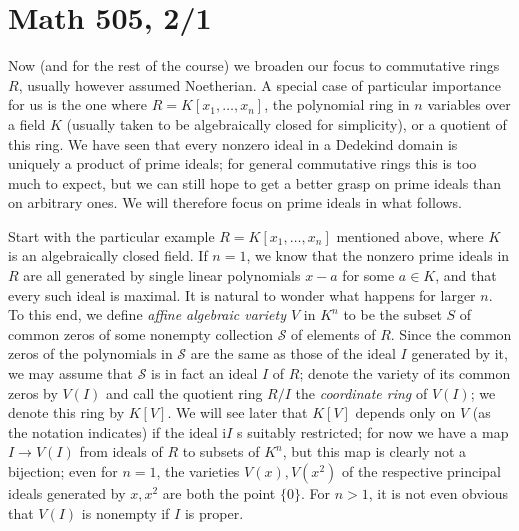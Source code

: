 \documentclass[10pt]{article}
\begin{document}
\section*{Math 505, 2/1}

Now (and for the rest of the course) we broaden our focus to commutative
rings $R$, usually however assumed Noetherian. A special case of
particular importance for us is the one where $R=K[x_1,\ldots,x_n]$, the
polynomial ring in $n$ variables over a field $K$ (usually taken to be
algebraically closed for simplicity), or a quotient of this ring. We
have seen that every nonzero ideal in a Dedekind domain is uniquely a
product of prime ideals; for general commutative rings this is too much
to expect, but we can still hope to get a better grasp on prime ideals
than on arbitrary ones. We will therefore focus on prime ideals in what
follows.

Start with the particular example $R=K[x_1,\ldots,x_n]$ mentioned above,
where $K$ is an algebraically closed field. If $n=1$, we know that the
nonzero prime ideals in $R$ are all generated by single linear
polynomials $x-a$ for some $a\in K$, and that every such ideal is
maximal. It is natural to wonder what happens for larger $n$. To this
end, we define {\sl affine algebraic variety $V$} in $K^n$ to be the
subset $S$ of common zeros of some nonempty collection $\mathcal S$ of
elements of $R$. Since the common zeros of the polynomials in $\mathcal
S$ are the same as those of the ideal $I$ generated by it, we may assume
that $\mathcal S$ is in fact an ideal $I$ of $R$; denote the variety of
its common zeros by $V(I)$ and call the quotient ring $R/I$ the {\sl
  coordinate ring} of $V(I)$; we denote this ring by $K[V]$. We will see
later that $K[V]$ depends only on $V$ (as the notation indicates) if the
ideal i$I$ s suitably restricted; for now we have a map $I\rightarrow
V(I)$ from ideals of $R$ to subsets of $K^n$, but this map is clearly
not a bijection; even for $n=1$, the varieties $V(x),V(x^2)$ of the
respective principal ideals generated by $x,x^2$ are both the point
$\{0\}$. For $n>1$, it is not even obvious that $V(I)$ is nonempty if
$I$ is proper.
\end{document}

